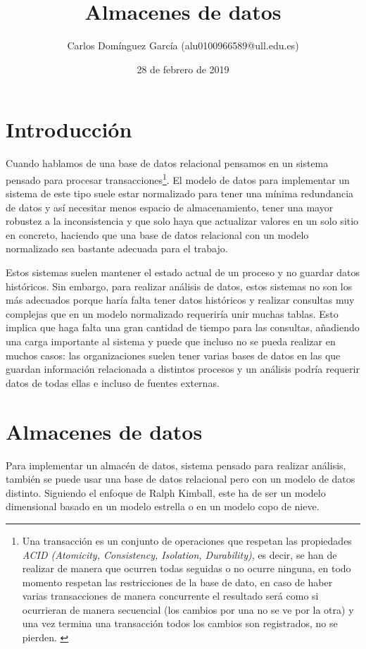 \documentclass[12pt]{article}
\title{Almacenes de datos}
\author{Carlos Domínguez García (alu0100966589@ull.edu.es)}
\date{28 de febrero de 2019}
\begin{document}
  \maketitle
  \pagebreak
  
  \tableofcontents
  \pagebreak

  \section{Introducción}
    Cuando hablamos de una base de datos relacional pensamos en un sistema pensado para procesar transacciones\footnote{Una transacción es un conjunto de operaciones que respetan las propiedades \textit{ACID (Atomicity, Consistency, Isolation, Durability)}, es decir, se han de realizar de manera que ocurren todas seguidas o no ocurre ninguna, en todo momento respetan las restricciones de la base de dato, en caso de haber varias transacciones de manera concurrente el resultado será como si ocurrieran de manera secuencial (los cambios por una no se ve por la otra) y una vez termina una transacción todos los cambios son registrados, no se pierden. \cite{Stackoverflow_AcidAndDatabaseTransactions}}. El modelo de datos para implementar un sistema de este tipo suele estar normalizado para tener una mínima redundancia de datos y así necesitar menos espacio de almacenamiento, tener una mayor robustez a la inconsistencia y que solo haya que actualizar valores en un solo sitio en concreto, haciendo que una base de datos relacional con un modelo normalizado sea bastante adecuada para el trabajo.
    
    Estos sistemas suelen mantener el estado actual de un proceso y no guardar datos históricos. Sin embargo, para realizar análisis de datos, estos sistemas no son los más adecuados porque haría falta tener datos históricos y realizar consultas muy complejas que en un modelo normalizado requeriría unir muchas tablas. Esto implica que haga falta una gran cantidad de tiempo para las consultas, añadiendo una carga importante al sistema y puede que incluso no se pueda realizar en muchos casos: las organizaciones suelen tener varias bases de datos en las que guardan información relacionada a distintos procesos y un análisis podría requerir datos de todas ellas e incluso de fuentes externas.
  
  \section{Almacenes de datos}

    Para implementar un almacén de datos, sistema pensado para realizar análisis, también se puede usar una base de datos relacional pero con un modelo de datos distinto. Siguiendo el enfoque de Ralph Kimball, este ha de ser un modelo dimensional basado en un modelo estrella o en un modelo copo de nieve.


  \printbibliography
  
\end{document}
